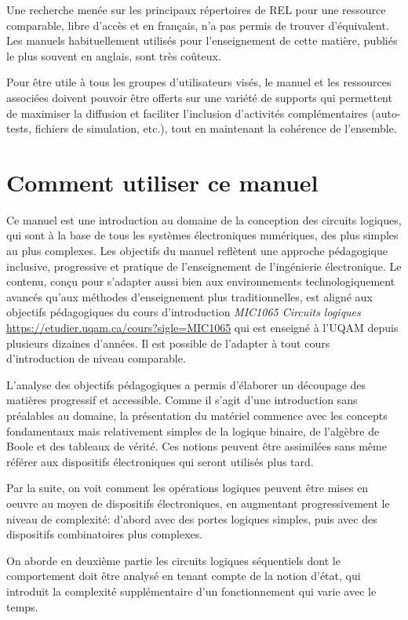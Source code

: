 \documentclass[letter, oneside]{book}
\begin{document}
Une recherche menée sur les principaux répertoires de REL pour une
ressource comparable, libre d'accès et en français, n'a pas permis de
trouver d'équivalent. Les manuels habituellement utilisés pour
l'enseignement de cette matière, publiés le plus souvent en anglais,
sont très coûteux.

Pour être utile à tous les groupes d'utilisateurs visés, le manuel et
les ressources associées doivent pouvoir être offerts sur une variété
de supports qui permettent de maximiser la diffusion et faciliter
l'inclusion d'activités complémentaires (auto-tests, fichiers de
simulation, etc.), tout en maintenant la cohérence de l'ensemble.

\section*{Comment utiliser ce manuel}
\label{sec:org9915d5e}

Ce manuel est une introduction au domaine de la conception des
circuits logiques, qui sont à la base de tous les systèmes
électroniques numériques, des plus simples au plus complexes. Les
objectifs du manuel reflètent une approche pédagogique inclusive,
progressive et pratique de l'enseignement de l'ingénierie
électronique. Le contenu, conçu pour s'adapter aussi bien aux
environnements technologiquement avancés qu'aux méthodes
d'enseignement plus traditionnelles, est aligné aux objectifs
pédagogiques du cours d'introduction \emph{MIC1065 Circuits logiques}
\url{https://etudier.uqam.ca/cours?sigle=MIC1065} qui est enseigné à l'UQAM
depuis plusieurs dizaines d'années. Il est possible de l'adapter à
tout cours d'introduction de niveau comparable.

L'analyse des objectifs pédagogiques a permis d'élaborer un découpage
des matières progressif et accessible. Comme il s'agit d'une
introduction sans préalables au domaine, la présentation du matériel
commence avec les concepts fondamentaux mais relativement simples de
la logique binaire, de l'algèbre de Boole et des tableaux de
vérité. Ces notions peuvent être assimilées sans même référer aux
dispositifs électroniques qui seront utilisés plus tard.

Par la suite, on voit comment les opérations logiques peuvent être
mises en oeuvre au moyen de dispositifs électroniques, en augmentant
progressivement le niveau de complexité: d'abord avec des portes
logiques simples, puis avec des dispositifs combinatoires plus
complexes. 

On aborde en deuxième partie les circuits logiques séquentiels dont le
comportement doit être analysé en tenant compte de la notion d'état,
qui introduit la complexité supplémentaire d'un fonctionnement qui
varie avec le temps.
\end{document}
